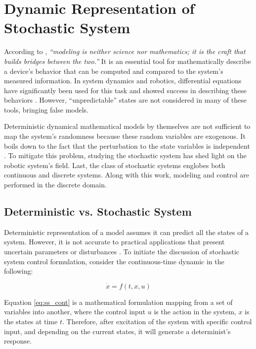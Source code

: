 \documentclass[]{hdsr}
\begin{document}
\vspace*{0.15in}

\section{Dynamic Representation of Stochastic System}
\label{sec1}

According to \citet{morrison2012art}, \textit{``modeling is neither science nor mathematics; it is the craft that builds bridges between the two.''} It is an essential tool for mathematically describe a device's behavior that can be computed and compared to the system's measured information. In system dynamics and robotics, differential equations have significantly been used for this task and showed success in describing these behaviors \citep{karnopp2012system,meriam2012engineering}. However, ``unpredictable'' states are not considered in many of these tools, bringing false models.

Deterministic dynamical mathematical models by themselves are not sufficient to map the system's randomness because these random variables are exogenous. It boils down to the fact that the perturbation to the state variables is independent \citep{morrison2012art}.  To mitigate this problem, studying the stochastic system has shed light on the robotic system's field. Last, the class of stochastic systems englobes both continuous and discrete systems.  Along with this work, modeling and control are performed in the discrete domain. 

\subsection{Deterministic vs. Stochastic System}

Deterministic representation of a model assumes it can predict all the states of a system. However, it is not accurate to practical applications that present uncertain parameters or disturbances \citep{skogestad2007multivariable}. To initiate the discussion of stochastic system control formulation, consider the continuous-time dynamic in the following:

\begin{equation}
    \dot{x} = f(t,x,u) \label{eq:ss_cont}
\end{equation}

Equation \ref{eq:ss_cont} is a mathematical formulation mapping from a set of variables into another, where the control input $u$ is the action in the system, $x$ is the states at time $t$. Therefore, after excitation of the system with specific control input, and depending on the current states, it will generate a determinist's response. 
\end{document}
